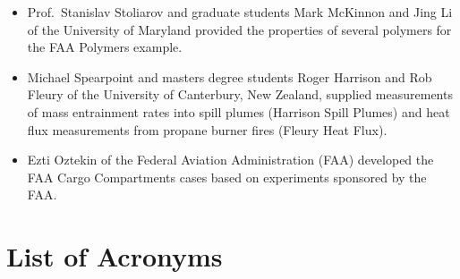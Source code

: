 \documentclass[11pt]{book}
\begin{document}
\begin{itemize}
\item Prof.~Stanislav Stoliarov and graduate students Mark McKinnon and Jing Li of the University of Maryland provided the properties of several polymers for the FAA Polymers example.
\item Michael Spearpoint and masters degree students Roger Harrison and Rob Fleury of the University of Canterbury, New Zealand, supplied measurements of mass entrainment rates into spill plumes (Harrison Spill Plumes) and heat flux measurements from propane burner fires (Fleury Heat Flux).
\item Ezti Oztekin of the Federal Aviation Administration (FAA) developed the FAA Cargo Compartments cases based on experiments sponsored by the FAA.
\end{itemize}


\cleardoublepage
{}
{}
\tableofcontents

\cleardoublepage
{}
{}
\listoffigures

\cleardoublepage
{}
{}
\listoftables

\chapter{List of Acronyms}
\end{document}
